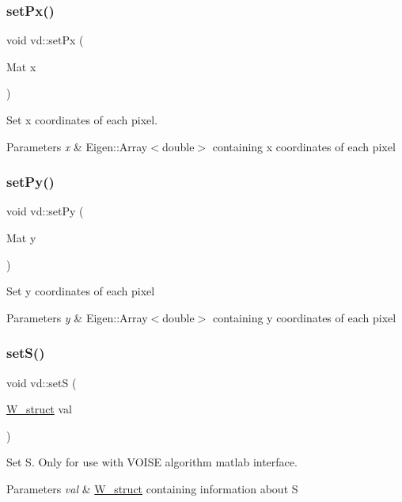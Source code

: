 \subsubsection{\texorpdfstring{set\+Px()}{setPx()}}
{\footnotesize\ttfamily void vd\+::set\+Px (\begin{DoxyParamCaption}\item[{Mat}]{x }\end{DoxyParamCaption})}

Set x coordinates of each pixel. 
\begin{DoxyParams}{Parameters}
{\em x} & Eigen\+::\+Array$<$double$>$ containing x coordinates of each pixel \\
\hline
\end{DoxyParams}
\mbox{\label{classvd_a8314de29eacf72f10afee2c67b0c9819}} 
\subsubsection{\texorpdfstring{set\+Py()}{setPy()}}
{\footnotesize\ttfamily void vd\+::set\+Py (\begin{DoxyParamCaption}\item[{Mat}]{y }\end{DoxyParamCaption})}

Set y coordinates of each pixel 
\begin{DoxyParams}{Parameters}
{\em y} & Eigen\+::\+Array$<$double$>$ containing y coordinates of each pixel \\
\hline
\end{DoxyParams}
\mbox{\label{classvd_a0b4c53a592ec499899a37c2e6364806a}} 
\subsubsection{\texorpdfstring{set\+S()}{setS()}}
{\footnotesize\ttfamily void vd\+::setS (\begin{DoxyParamCaption}\item[{\mbox{\hyperlink{structW__struct}{W\+\_\+struct}}}]{val }\end{DoxyParamCaption})}

Set S. Only for use with V\+O\+I\+SE algorithm matlab interface. 
\begin{DoxyParams}{Parameters}
{\em val} & \mbox{\hyperlink{structW__struct}{W\+\_\+struct}} containing information about S \\
\hline
\end{DoxyParams}
\mbox{\label{classvd_a739318bbb45d4facfcc1899c71b91720}} 
